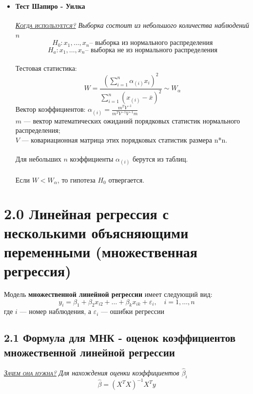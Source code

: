 \documentclass[a0,final]{a0poster}
\begin{document}
\begin{multicols}{4}
\begin{itemize}
\item \textbf{Тест Шапиро - Уилка}\\
\\
\underline{\textsc{\textit{Когда используется?}}} \textit{Выборка состоит из небольшого количества наблюдений $n$}
\[H_0: x_1, \ldots,x_n \text{-- выборка из нормального распределения}\]
\[H_a: x_1, \ldots,x_n \text{-- выборка не из нормального распределения}\]
\\
Тестовая статистика:
\[W=\frac{(\sum\limits_{i = 1}^n{{\alpha}_{(i)}x_{i}})^2}{\sum\limits_{i = 1}^n{(x_{(i)} - \bar{x})^2}} \sim W_\alpha\]
Вектор коэффициентов: ${\alpha}_{(i)} = \frac{m^TV^{-1}}{m^TV^{-1}V^{-1}m}$\\

$m$ — вектор математических ожиданий порядковых статистик нормального распределения; \\
$V$ — ковариационная матрица этих порядковых статистик размера n*n.\\
\\
Для небольших $n$ коэффициенты $\alpha_{(i)}$ берутся из таблиц.\\
\\
Если $W<W_\alpha$, то гипотеза $H_0$ отвергается.
\end{itemize}

\columnbreak

\section*{2.0 Линейная регрессия с несколькими объясняющими переменными (множественная регрессия)}
\begin{tcolorbox}[colback=red!5!white,colframe=red!75!black]
Модель \textbf{множественной линейной регрессии} имеет следующий вид:
 \[y_i={\beta}_1 +{\beta}_2x_{i2} + \ldots + \beta_kx_{ik} + {\varepsilon}_i, \quad i = 1, \ldots,n\]
 где $i$ — номер наблюдения, а ${\varepsilon}_i$ — ошибки регрессии
\end{tcolorbox}

\subsection*{\textbf{2.1 Формула для  МНК - оценок коэффициентов множественной линейной регрессии}}
\underline{\textsc{\textit{Зачем она нужна?}}} \textit{Для нахождения оценки коэффициентов $\hat{\beta}_i$}\\
\[\hat{\beta} = (X^TX)^{-1}X^Ty\] \\


\end{multicols}
\end{document}

